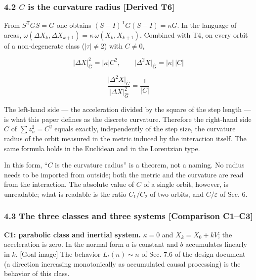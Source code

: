 \documentclass[
  a4paper,
]{article}
\begin{document}
\subsubsection{\texorpdfstring{4.2 \(C\) is the curvature radius
{[}Derived
T6{]}}{4.2 C is the curvature radius {[}Derived T6{]}}}\label{c-is-the-curvature-radius-derived-t6}

From \(S^{\mathsf T}GS=G\) one obtains
\((S-I)^{\mathsf T}G(S-I)=\kappa G\). In the language of areas,
\(\omega(\Delta X_k,\Delta X_{k+1})=\kappa\,\omega(X_k,X_{k+1})\).
Combined with T4, on every orbit of a non-degenerate class
(\(\lvert\tau\rvert\neq2\)) with \(C\neq0\),

\[
\lvert\Delta X\rvert_{\hat G}^2=\lvert\kappa\rvert C^2,\qquad\lvert\Delta^2X\rvert_{\hat G}=\lvert\kappa\rvert\,\lvert C\rvert
\]

\[
\boxed{\;\frac{\lvert\Delta^2X\rvert_{\hat G}}{\lvert\Delta X\rvert_{\hat G}^{2}}=\frac{1}{\lvert C\rvert}\;}
\]

The left-hand side --- the acceleration divided by the square of the
step length --- is what this paper defines as the discrete curvature.
Therefore the right-hand side \(C\) of \(\sum z_n^2=C^2\) equals
exactly, independently of the step size, the curvature radius of the
orbit measured in the metric induced by the interaction itself. The same
formula holds in the Euclidean and in the Lorentzian type.

In this form, ``\(C\) is the curvature radius'' is a theorem, not a
naming. No radius needs to be imported from outside; both the metric and
the curvature are read from the interaction. The absolute value of \(C\)
of a single orbit, however, is unreadable; what is readable is the ratio
\(C_1/C_2\) of two orbits, and \(C/\varepsilon\) of Sec. 6.

\subsubsection{4.3 The three classes and three systems {[}Comparison
C1--C3{]}}\label{the-three-classes-and-three-systems-comparison-c1c3}

\textbf{C1: parabolic class and inertial system.} \(\kappa=0\) and
\(X_k=X_0+kV\); the acceleration is zero. In the normal form \(a\) is
constant and \(b\) accumulates linearly in \(k\). {[}Goal image{]} The
behavior \(L_t(n)\sim n\) of Sec. 7.6 of the design document (a
direction increasing monotonically as accumulated causal processing) is
the behavior of this class.
\end{document}
